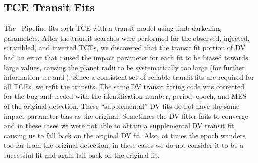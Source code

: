 \subsection{TCE Transit Fits}

The \Kepler\ Pipeline fits each TCE with a \citet{Mandel2002} transit model using \citet{Claret2000} limb darkening parameters. After the transit searches were performed for the observed, injected, scrambled, and inverted TCEs, we discovered that the transit fit portion of DV had an error that caused the impact parameter for each fit to be biased towards large values, causing the planet radii to be systematically too large (for further information see \citealt{Christiansen2017} and \citealt{Coughlin2017a}). Since a consistent set of reliable transit fits are required for all TCEs, we refit the transits.  The same DV transit fitting code was corrected for the bug and seeded with the \Kepler{} identification number, period, epoch, and MES of the original detection. These ``supplemental'' DV fits do not have the same impact parameter bias as the original.  Sometimes the DV fitter fails to converge and in these cases we were not able to obtain a supplemental DV transit fit, causing us to fall back on the original DV fit. Also, at times the epoch wanders too far from the original detection; in these cases we do not consider it to be a successful fit and again fall back on the original fit.

